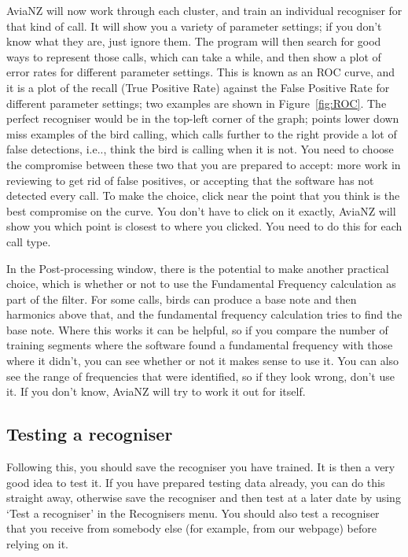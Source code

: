\documentclass{article}
\begin{document}
AviaNZ will now work through each cluster, and train an individual recogniser for that kind of call. It will show you a variety of parameter settings; if you don't know what they are, just ignore them. The program will then search for good ways to represent those calls, which can take a while, and then show a plot of error rates for different parameter settings. This is known as an ROC curve, and it is a plot of the recall (True Positive Rate) against the False Positive Rate for different parameter settings; two examples are shown in Figure~\ref{fig:ROC}. The perfect recogniser would be in the top-left corner of the graph; points lower down miss examples of the bird calling, which calls further to the right provide a lot of false detections, i.e.., think the bird is calling when it is not. You need to choose the compromise between these two that you are prepared to accept: more work in reviewing to get rid of false positives, or accepting that the software has not detected every call. To make the choice, click near the point that you think is the best compromise on the curve. You don't have to click on it exactly, AviaNZ will show you which point is closest to where you clicked. You need to do this for each call type. 

In the Post-processing window, there is the potential to make another practical choice, which is whether or not to use the Fundamental Frequency calculation as part of the filter. For some calls, birds can produce a base note and then harmonics above that, and the fundamental frequency calculation tries to find the base note. Where this works it can be helpful, so if you compare the number of training segments where the software found a fundamental frequency with those where it didn't, you can see whether or not it makes sense to use it. You can also see the range of frequencies that were identified, so if they look wrong, don't use it. If you don't know, AviaNZ will try to work it out for itself. 

\subsection{Testing a recogniser}\label{sec:testfilter}

Following this, you should save the recogniser you have trained. It is then a very good idea to test it. If you have prepared testing data already, you can do this straight away, otherwise save the recogniser and then test at a later date by using `Test a recogniser' in the Recognisers menu. You should also test a recogniser that you receive from somebody else (for example, from our webpage) before relying on it.
\end{document}
